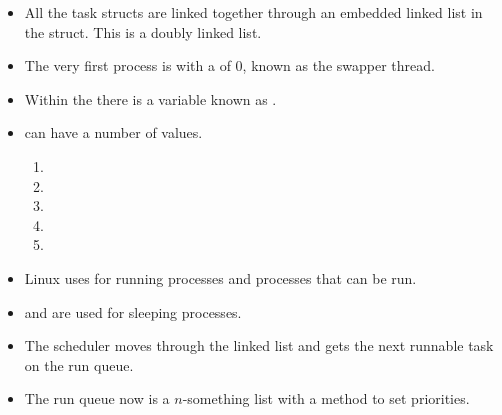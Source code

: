 \documentclass[]{article}
\begin{document}
\begin{itemize}
\item All the task structs are linked together through an embedded linked list
in the  struct. This is a doubly linked list.
\item The very first process is  with a  of 0, known
as the swapper thread.
\item Within the  there is a  variable known
as .
\item {} can have a number of values.
\begin{enumerate}
\item {}
\item {}
\item {}
\item {}
\item {}
\end{enumerate}
\item Linux uses  for running processes and processes that
can be run.
\item {} and  are used for
sleeping processes.
\item The scheduler moves through the linked list and gets the next runnable
task on the run queue.
\item The run queue now is a $n$-something list with a method to set priorities.
\end{itemize}
\end{document}
